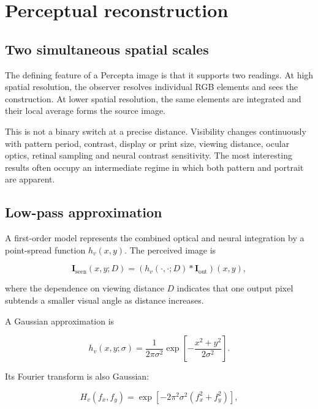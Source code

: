 \section{Perceptual reconstruction}

\subsection{Two simultaneous spatial scales}

The defining feature of a Percepta image is that it supports two readings. At high spatial resolution, the observer resolves individual RGB elements and sees the construction. At lower spatial resolution, the same elements are integrated and their local average forms the source image.

This is not a binary switch at a precise distance. Visibility changes continuously with pattern period, contrast, display or print size, viewing distance, ocular optics, retinal sampling and neural contrast sensitivity. The most interesting results often occupy an intermediate regime in which both pattern and portrait are apparent.

\subsection{Low-pass approximation}

A first-order model represents the combined optical and neural integration by a point-spread function $h_v(x,y)$. The perceived image is

\begin{equation}
\mathbf{I}_{\mathrm{seen}}(x,y;D)
=
\left(h_v(\cdot,\cdot;D)*\mathbf{I}_{\mathrm{out}}\right)(x,y),
\label{eq:visualconv}
\end{equation}

where the dependence on viewing distance $D$ indicates that one output pixel subtends a smaller visual angle as distance increases.

A Gaussian approximation is

\begin{equation}
h_v(x,y;\sigma)=
\frac{1}{2\pi\sigma^2}
\exp\!\left[-\frac{x^2+y^2}{2\sigma^2}\right].
\label{eq:gaussianpsf}
\end{equation}

Its Fourier transform is also Gaussian:

\begin{equation}
H_v(f_x,f_y)=
\exp\!\left[-2\pi^2\sigma^2(f_x^2+f_y^2)\right],
\label{eq:gaussianmtf}
\end{equation}

